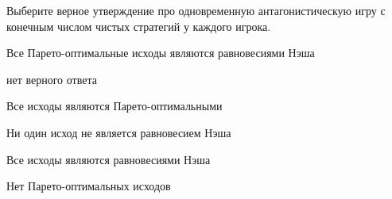 
\begin{question}
Выберите верное утверждение про одновременную антагонистическую игру с конечным числом чистых стратегий у каждого игрока.
\begin{answerlist}
  \item Все Парето-оптимальные исходы являются равновесиями Нэша
  \item нет верного ответа
  \item Все исходы являются Парето-оптимальными
  \item Ни один исход не является равновесием Нэша
  \item Все исходы являются равновесиями Нэша
  \item Нет Парето-оптимальных исходов
\end{answerlist}
\end{question}


